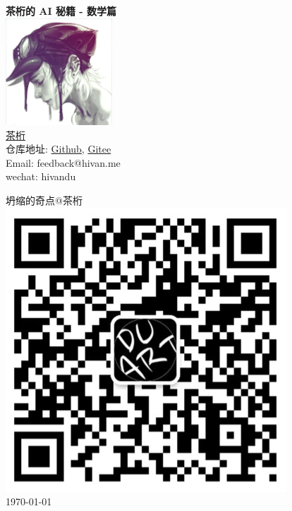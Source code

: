 \begin{titlepage}
  \centering
  \Huge\textbf{茶桁的 AI 秘籍 - 数学篇} \\
  \vspace*{1cm}
  \includegraphics[width=0.3\textwidth]{logo.png} \\ %
  \vspace*{0.5cm}
  \small{\href{https://hivan.me}{茶桁}} \\
  \vspace*{1cm}
  \small{仓库地址: \href{https://github.com/hivandu/AI_Cheats}{Github}, \href{https://gitee.com/hivandu/ai_cheats}{Gitee}} \\
  \vspace*{0.2cm}
  \small{Email: feedback@hivan.me} \\
  \vspace*{0.2cm}
  \small{wechat: hivandu} \\
  \vspace{1cm}
  \vfill
  \hfill %
  \begin{minipage}[h]{0.2\textwidth}%
    \centering
    \small{坍缩的奇点@茶桁} \\
    \vspace{0.2em}
    \includegraphics[width=\textwidth]{publisher.png} \\ %
    \vspace{1em}
    \small\today %
  \end{minipage}
\end{titlepage}